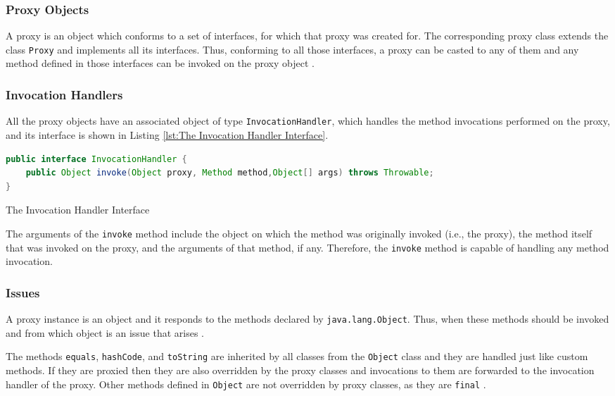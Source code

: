 \subsubsection{Proxy Objects}\label{Proxy Objects}
A proxy is an object which conforms to a set of interfaces, for which that proxy was created for. 
The corresponding proxy class extends the class \texttt{Proxy} and implements all its interfaces.
Thus, conforming to all those interfaces, a proxy can be casted to any of them and any method defined in those interfaces can be invoked on the proxy object \cite{eugster2006uniform}.

\subsubsection{Invocation Handlers}\label{Invocation Handlers}
All the proxy objects have an associated object of type \texttt{InvocationHandler}, which handles the method invocations performed on the proxy, and its interface is shown in Listing \ref{lst:The Invocation Handler Interface}.

\begin{sourcecode}
	\begin{lstlisting}[language=Java]
public interface InvocationHandler {
	public Object invoke(Object proxy, Method method,Object[] args) throws Throwable;
}		
	\end{lstlisting}
	\caption{The Invocation Handler Interface}
	\label{lst:The Invocation Handler Interface}
\end{sourcecode}

The arguments of the \texttt{invoke} method include the object on which the method was originally invoked (i.e., the proxy), the method itself that was invoked on the proxy, and the arguments of that method, if any.
Therefore, the \texttt{invoke} method is capable of handling any method invocation.

\subsubsection{Issues}\label{Dynamic Proxies Issues}
A proxy instance is an object and it responds to the methods declared by \texttt{java.lang.Object}. 
Thus, when these methods should be invoked and from which object is an issue that arises \cite{forman2004java}.

The methods \texttt{equals}, \texttt{hashCode}, and \texttt{toString} are inherited by all classes from the \texttt{Object} class and they are handled just like custom methods.
If they are proxied then they are also overridden by the proxy classes and invocations to them are forwarded to the invocation handler of the proxy. 
Other methods defined in \texttt{Object} are not overridden by proxy classes, as they are \texttt{final} \cite{eugster2006uniform}.

